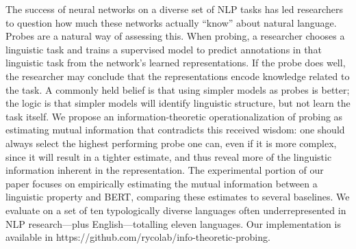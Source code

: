 The success of neural networks on a diverse set of NLP tasks has led researchers to question how much these networks actually ``know'' about natural language. Probes are a natural way of assessing this. When probing, a researcher chooses a linguistic task and trains a supervised model to predict annotations in that linguistic task from the network's learned representations. If the probe does well, the researcher may conclude that the representations encode knowledge related to the task. A commonly held belief is that using simpler models as probes is better; the logic is that simpler models will identify linguistic structure, but not learn the task itself. We propose an information-theoretic operationalization of probing as estimating mutual information that contradicts this received wisdom: one should always select the highest performing probe one can, even if it is more complex, since it will result in a tighter estimate, and thus reveal more of the linguistic information inherent in the representation. The experimental portion of our paper focuses on empirically estimating the mutual information between a linguistic property and BERT, comparing these estimates to several baselines. We evaluate on a set of ten typologically diverse languages often underrepresented in NLP research---plus English---totalling eleven languages. Our implementation is available in https://github.com/rycolab/info-theoretic-probing.
